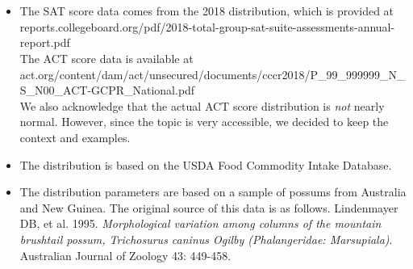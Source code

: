 \section{}
\label{ch_distributions_data}

\begin{itemize}
\setlength{\itemsep}{0mm}
\item[\ref{normalDist}]
    The SAT score data comes from the 2018 distribution,
    which is provided at \\
    {\small
        {reports.collegeboard.org/pdf/2018-total-group-sat-suite-assessments-annual-report.pdf}} \\
    The ACT score data is available at \\
    {\footnotesize
        {act.org/content/dam/act/unsecured/documents/cccr2018/P\_99\_999999\_N\_S\_N00\_ACT-GCPR\_National.pdf}} \\
    We also acknowledge that the actual ACT score distribution
    is \emph{not} nearly normal.
    However, since the topic is very accessible,
    we decided to keep the context and examples.
\item[\ref{normalDist}]
    The distribution is based on the
    USDA Food Commodity Intake Database.
\item[\ref{normalDist}]
    The distribution parameters are based on a sample
    of possums from Australia and New Guinea.
    The original source of this data is as follows.
    Lindenmayer DB, et al. 1995.
    \emph{Morphological variation among columns of the
        mountain brushtail possum, Trichosurus caninus
        Ogilby (Phalangeridae: Marsupiala)}.
    Australian Journal of Zoology 43: 449-458.



\end{itemize}
